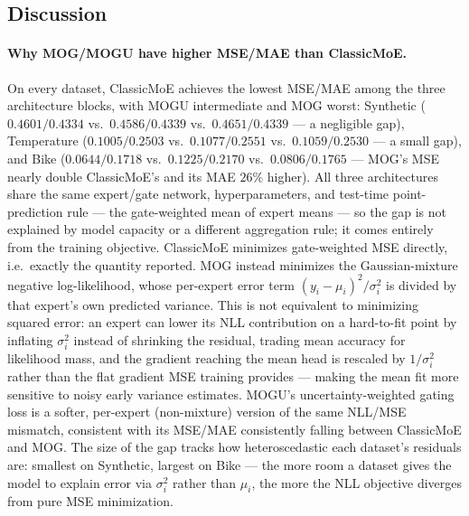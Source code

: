 \documentclass[11pt]{article}
\begin{document}
\subsection{Discussion}

\paragraph{Why MOG/MOGU have higher MSE/MAE than ClassicMoE.} On every dataset, ClassicMoE achieves
the lowest MSE/MAE among the three architecture blocks, with MOGU intermediate and MOG worst:
Synthetic ($0.4601/0.4334$ vs.\ $0.4586/0.4339$ vs.\ $0.4651/0.4339$ — a negligible gap),
Temperature ($0.1005/0.2503$ vs.\ $0.1077/0.2551$ vs.\ $0.1059/0.2530$ — a small gap), and Bike
($0.0644/0.1718$ vs.\ $0.1225/0.2170$ vs.\ $0.0806/0.1765$ — MOG's MSE nearly double ClassicMoE's
and its MAE $26\%$ higher). All three architectures share the same expert/gate network,
hyperparameters, and test-time point-prediction rule — the gate-weighted mean of expert means — so
the gap is not explained by model capacity or a different aggregation rule; it comes entirely from
the training objective. ClassicMoE minimizes gate-weighted MSE directly, i.e.\ exactly the quantity
reported. MOG instead minimizes the Gaussian-mixture negative log-likelihood, whose per-expert
error term $(y_i-\mu_i)^2/\sigma_i^2$ is divided by that expert's own predicted variance. This is
not equivalent to minimizing squared error: an expert can lower its NLL contribution on a
hard-to-fit point by inflating $\sigma_i^2$ instead of shrinking the residual, trading mean
accuracy for likelihood mass, and the gradient reaching the mean head is rescaled by $1/\sigma_i^2$
rather than the flat gradient MSE training provides — making the mean fit more sensitive to noisy
early variance estimates. MOGU's uncertainty-weighted gating loss is a softer, per-expert
(non-mixture) version of the same NLL/MSE mismatch, consistent with its MSE/MAE consistently
falling between ClassicMoE and MOG. The size of the gap tracks how heteroscedastic each dataset's
residuals are: smallest on Synthetic, largest on Bike — the more room a dataset gives the model to
explain error via $\sigma_i^2$ rather than $\mu_i$, the more the NLL objective diverges from pure
MSE minimization.
\end{document}

